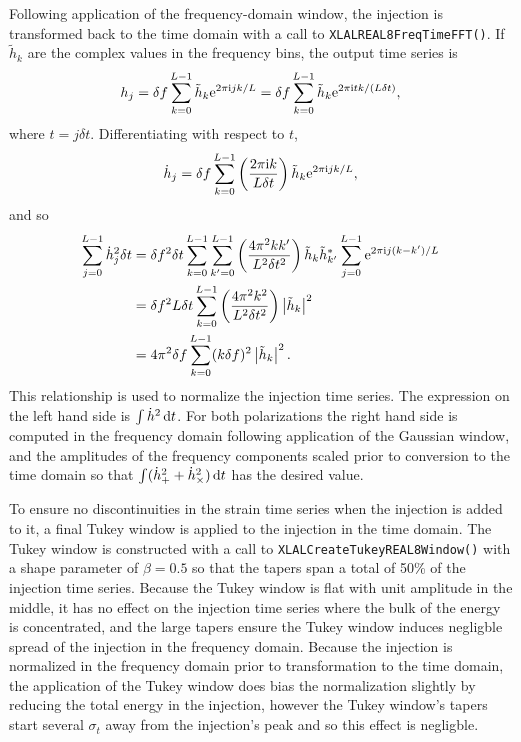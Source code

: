 \documentclass[10pt]{article}
\begin{document}
Following application of the frequency-domain window, the injection is
transformed back to the time domain with a call to
\texttt{XLALREAL8FreqTimeFFT()}.  If \(\tilde{h}_{k}\) are the complex
values in the frequency bins, the output time series is
\begin{equation}
h_{j}
   = \delta f \sum_{k = 0}^{L - 1} \tilde{h}_{k} \mathrm{e}^{2 \pi \mathrm{i} j k / L}
   = \delta f \sum_{k = 0}^{L - 1} \tilde{h}_{k} \mathrm{e}^{2 \pi \mathrm{i} t k / (L
   \delta t)},
\end{equation}
where \(t = j \delta t\).  Differentiating with respect to \(t\),
\begin{equation}
\dot{h}_{j}
   = \delta f \sum_{k = 0}^{L - 1} \left( \frac{2 \pi \mathrm{i} k}{L \delta t}
   \right) \tilde{h}_{k} \mathrm{e}^{2 \pi \mathrm{i} j k / L},
\end{equation}
and so
\begin{align}
\sum_{j = 0}^{L - 1} \dot{h}_{j}^{2} \delta t
   & = \delta f^{2} \delta t \sum_{k = 0}^{L - 1} \sum_{k' = 0}^{L - 1}
   \left( \frac{4 \pi^{2} k k'}{L^{2} \delta t^{2}} \right) \tilde{h}_{k}
   \tilde{h}_{k'}^{*} \sum_{j = 0}^{L - 1} \mathrm{e}^{2 \pi \mathrm{i} j (k - k') /
   L}
   \\
   & = \delta f^{2} L \delta t \sum_{k = 0}^{L - 1} \left( \frac{4 \pi^{2}
   k^{2}}{L^{2} \delta t^{2}} \right) \left|\tilde{h}_{k}\right|^{2}
   \\
   & = 4 \pi^{2} \delta f \sum_{k = 0}^{L - 1} (k \delta f)^{2}
   \left|\tilde{h}_{k}\right|^{2}.
\end{align}
This relationship is used to normalize the injection time series.  The
expression on the left hand side is \(\int \dot{h}^{2} \,\mathrm{d} t\).  For both
polarizations the right hand side is computed in the frequency domain
following application of the Gaussian window, and the amplitudes of the
frequency components scaled prior to conversion to the time domain so that
\(\int (\dot{h}_{+}^{2} + \dot{h}_{\times}^{2}) \,\mathrm{d} t\) has the desired
value.

To ensure no discontinuities in the strain time series when the injection
is added to it, a final Tukey window is applied to the injection in the
time domain.  The Tukey window is constructed with a call to
\texttt{XLALCreateTukeyREAL8Window()} with a shape parameter of \(\beta =
0.5\) so that the tapers span a total of 50\% of the injection time series.
Because the Tukey window is flat with unit amplitude in the middle, it has
no effect on the injection time series where the bulk of the energy is
concentrated, and the large tapers ensure the Tukey window induces
negligble spread of the injection in the frequency domain.  Because the
injection is normalized in the frequency domain prior to transformation to
the time domain, the application of the Tukey window does bias the
normalization slightly by reducing the total energy in the injection,
however the Tukey window's tapers start several \(\sigma_{t}\) away from
the injection's peak and so this effect is negligble.
\end{document}
